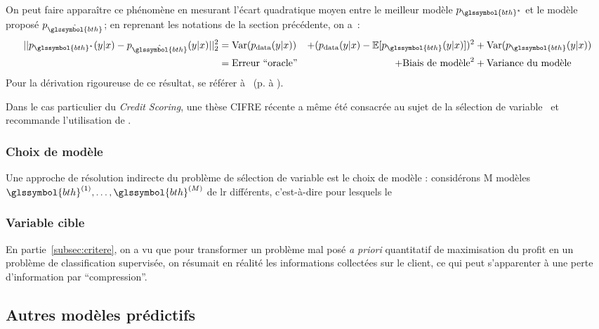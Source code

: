On peut faire apparaître ce phénomène en mesurant l'écart quadratique moyen entre le meilleur modèle $p_{\glssymbol{bth}^\star}$ et le modèle proposé $p_{\hat{\glssymbol{bth}}}$; en reprenant les notations de la section précédente, on a~:
\begin{align*}
||p_{\glssymbol{bth}^\star}(y|x) - p_{\hat{\glssymbol{bth}}}(y|x)||_2^2 & = \text{Var}(p_{\text{data}}(y|x)) & + (p_{\text{data}}(y|x) - \mathbb{E}[p_{\glssymbol{bth}}(y|x)])^2 & + \text{Var}(p_{\glssymbol{bth}}(y|x)) \\
& = \text{Erreur ``oracle''} & + \text{Biais de modèle}^2 & + \text{Variance du modèle}
\end{align*}
Pour la dérivation rigoureuse de ce résultat, se référer à~\cite{} (p. à ).


Dans le cas particulier du \textit{Credit Scoring}, une thèse CIFRE récente a même été consacrée au sujet de la sélection de variable~\cite{vital2016} et recommande l'utilisation de .


\subsubsection{Choix de modèle}

Une approche de résolution indirecte du problème de sélection de variable est le choix de modèle : considérons M modèles $\glssymbol{bth}^{(1)},\dots,\glssymbol{bth}^{(M)}$ de \gls{lr} différents, c'est-à-dire pour lesquels le 


\subsubsection{Variable cible}

En partie~\ref{subsec:critere}, on a vu que pour transformer un problème mal posé \textit{a priori} quantitatif de maximisation du profit en un problème de classification supervisée, on résumait en réalité les informations collectées sur le client, ce qui peut s'apparenter à une perte d'information par ``compression''.





\subsection{Autres modèles prédictifs}

